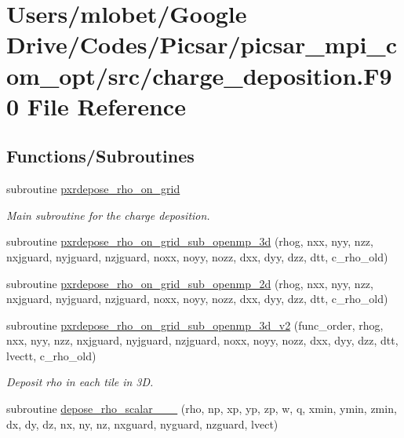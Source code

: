 \hypertarget{charge__deposition_8_f90}{}\section{Users/mlobet/\+Google Drive/\+Codes/\+Picsar/picsar\+\_\+mpi\+\_\+com\+\_\+opt/src/charge\+\_\+deposition.F90 File Reference}
\label{charge__deposition_8_f90}
\subsection*{Functions/\+Subroutines}
\begin{DoxyCompactItemize}
\item 
subroutine \hyperlink{charge__deposition_8_f90_a35ce588d3192033ca711fc1e13ba35b0}{pxrdepose\+\_\+rho\+\_\+on\+\_\+grid}
\begin{DoxyCompactList}\small\item\em Main subroutine for the charge deposition. \end{DoxyCompactList}\item 
subroutine \hyperlink{charge__deposition_8_f90_afa611a1848b404872ce900c3eb0573bc}{pxrdepose\+\_\+rho\+\_\+on\+\_\+grid\+\_\+sub\+\_\+openmp\+\_\+3d} (rhog, nxx, nyy, nzz, nxjguard, nyjguard, nzjguard, noxx, noyy, nozz, dxx, dyy, dzz, dtt, c\+\_\+rho\+\_\+old)
\item 
subroutine \hyperlink{charge__deposition_8_f90_ab4d6c7838c470fda0e5bbc3ea68b0917}{pxrdepose\+\_\+rho\+\_\+on\+\_\+grid\+\_\+sub\+\_\+openmp\+\_\+2d} (rhog, nxx, nyy, nzz, nxjguard, nyjguard, nzjguard, noxx, noyy, nozz, dxx, dyy, dzz, dtt, c\+\_\+rho\+\_\+old)
\item 
subroutine \hyperlink{charge__deposition_8_f90_a7e9f7c059faf5920428cdfec1181a9a8}{pxrdepose\+\_\+rho\+\_\+on\+\_\+grid\+\_\+sub\+\_\+openmp\+\_\+3d\+\_\+v2} (func\+\_\+order, rhog, nxx, nyy, nzz, nxjguard, nyjguard, nzjguard, noxx, noyy, nozz, dxx, dyy, dzz, dtt, lvectt, c\+\_\+rho\+\_\+old)
\begin{DoxyCompactList}\small\item\em Deposit rho in each tile in 3D. \end{DoxyCompactList}\item 
subroutine \hyperlink{charge__deposition_8_f90_a448f1cab6e843064b45674d43a320022}{depose\+\_\+rho\+\_\+scalar\+\_\+\_\+\_} (rho, np, xp, yp, zp, w, q, xmin, ymin, zmin, dx, dy, dz, nx, ny, nz,                               nxguard, nyguard, nzguard, lvect)

\end{DoxyCompactItemize}
